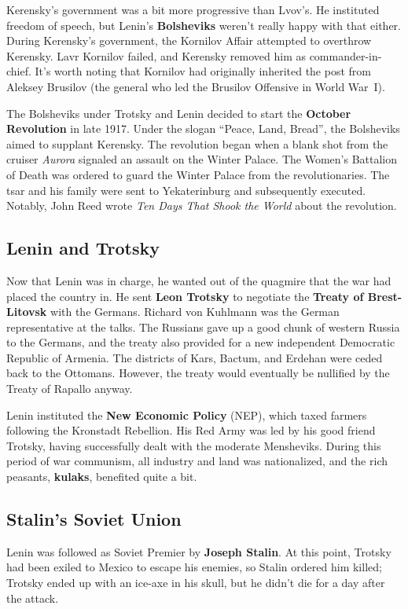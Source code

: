 Kerensky's government was a bit more progressive than Lvov's.
He instituted freedom of speech,
but Lenin's \textbf{Bolsheviks} weren't really happy with that either.
During Kerensky's government, the Kornilov Affair attempted to overthrow Kerensky.
Lavr Kornilov failed, and Kerensky removed him as commander-in-chief.
It's worth noting that Kornilov had originally inherited the post from Aleksey Brusilov
(the general who led the Brusilov Offensive in World War~I).

The Bolsheviks under Trotsky and Lenin decided to start the
\textbf{October Revolution} in late 1917.
Under the slogan ``Peace, Land, Bread'', the Bolsheviks aimed to supplant Kerensky.
The revolution began when a blank shot from the cruiser
\textit{Aurora} signaled an assault on the Winter Palace.
The Women's Battalion of Death was ordered to guard the Winter Palace from the revolutionaries.
The tsar and his family were sent to Yekaterinburg and subsequently executed.
Notably, John Reed wrote \textit{Ten Days That Shook the World} about the revolution.

\subsection*{Lenin and Trotsky}

Now that Lenin was in charge, he wanted out of the quagmire that the war had placed the country in.
He sent \textbf{Leon Trotsky} to negotiate the \textbf{Treaty of Brest-Litovsk} with the Germans.
Richard von Kuhlmann was the German representative at the talks.
The Russians gave up a good chunk of western Russia to the Germans,
and the treaty also provided for a new independent Democratic Republic of Armenia.
The districts of Kars, Bactum, and Erdehan were ceded back to the Ottomans.
However, the treaty would eventually be nullified by the Treaty of Rapallo anyway.

Lenin instituted the \textbf{New Economic Policy} (NEP),
which taxed farmers following the Kronstadt Rebellion.
His Red Army was led by his good friend Trotsky,
having successfully dealt with the moderate Mensheviks.
During this period of war communism, all industry and land was nationalized,
and the rich peasants, \textbf{kulaks}, benefited quite a bit.

\subsection*{Stalin's Soviet Union}

Lenin was followed as Soviet Premier by \textbf{Joseph Stalin}.
At this point, Trotsky had been exiled to Mexico to escape his enemies,
so Stalin ordered him killed;
Trotsky ended up with an ice-axe in his skull, but he didn't die for a day after the attack.

